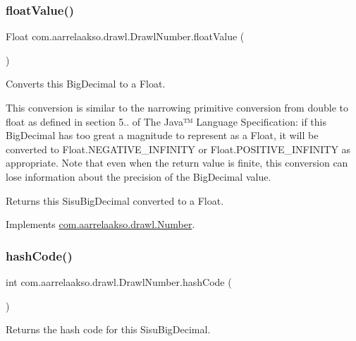 \subsubsection{\texorpdfstring{float\+Value()}{floatValue()}}
{\footnotesize\ttfamily Float com.\+aarrelaakso.\+drawl.\+Drawl\+Number.\+float\+Value (\begin{DoxyParamCaption}{ }\end{DoxyParamCaption})}



Converts this Big\+Decimal to a Float. 

This conversion is similar to the narrowing primitive conversion from double to float as defined in section 5.. of The Java™ Language Specification\+: if this Big\+Decimal has too great a magnitude to represent as a Float, it will be converted to Float.\+N\+E\+G\+A\+T\+I\+V\+E\+\_\+\+I\+N\+F\+I\+N\+I\+TY or Float.\+P\+O\+S\+I\+T\+I\+V\+E\+\_\+\+I\+N\+F\+I\+N\+I\+TY as appropriate. Note that even when the return value is finite, this conversion can lose information about the precision of the Big\+Decimal value.

\begin{DoxyReturn}{Returns}
this Sisu\+Big\+Decimal converted to a Float. 
\end{DoxyReturn}


Implements \hyperlink{interfacecom_1_1aarrelaakso_1_1drawl_1_1_number_ad6df5caf5478cc3f85cc808cf39a0610}{com.\+aarrelaakso.\+drawl.\+Number}.

\mbox{\label{classcom_1_1aarrelaakso_1_1drawl_1_1_drawl_number_a0048361007923e4b902a4581eb9ba45c}} 
\subsubsection{\texorpdfstring{hash\+Code()}{hashCode()}}
{\footnotesize\ttfamily int com.\+aarrelaakso.\+drawl.\+Drawl\+Number.\+hash\+Code (\begin{DoxyParamCaption}{ }\end{DoxyParamCaption})}



Returns the hash code for this Sisu\+Big\+Decimal. 

